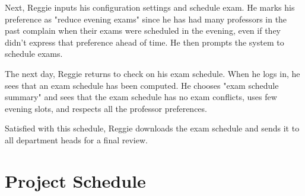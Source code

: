 \documentclass[11pt]{article}
\begin{document}
\begin{description}
Next, Reggie inputs his configuration settings and schedule exam.
He marks his preference as "reduce evening exams" since he has had many professors
in the past complain when their exams were scheduled in the evening,
even if they didn't express that preference ahead of time.
He then prompts the system to schedule exams.

The next day, Reggie returns to check on his exam schedule.
When he logs in, he sees that an exam schedule has been computed.
He chooses "exam schedule summary" and sees that
the exam schedule has no exam conflicts, uses few evening slots,
and respects all the professor preferences.

Satisfied with this schedule, Reggie downloads the exam schedule
 and sends it to all department heads for a final review.


\end{description}

\section{Project Schedule} %
\end{document}

